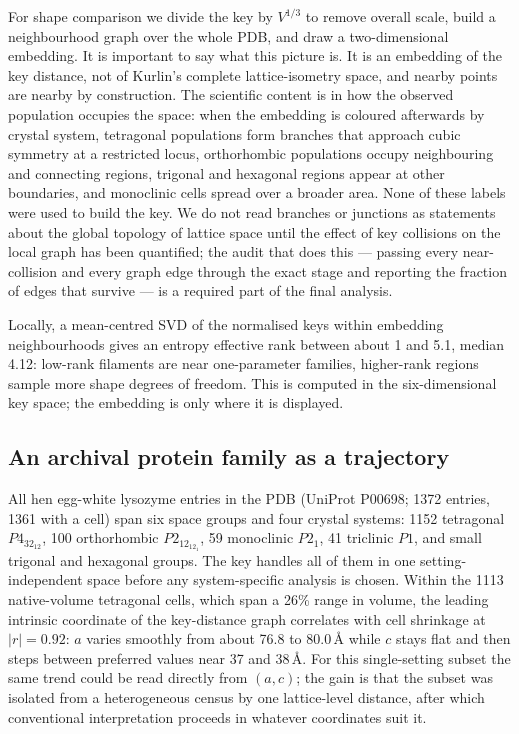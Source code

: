 \documentclass[11pt]{article}
\newcommand{\Ang}{\text{\AA}}
\begin{document}
For shape comparison we divide the key by $V^{1/3}$ to remove overall scale, build a neighbourhood graph over the whole PDB, and draw a two-dimensional embedding. It is important to say what this picture is. It is an embedding of the key distance, not of Kurlin's complete lattice-isometry space, and nearby points are nearby by construction. The scientific content is in how the observed population occupies the space: when the embedding is coloured afterwards by crystal system, tetragonal populations form branches that approach cubic symmetry at a restricted locus, orthorhombic populations occupy neighbouring and connecting regions, trigonal and hexagonal regions appear at other boundaries, and monoclinic cells spread over a broader area. None of these labels were used to build the key. We do not read branches or junctions as statements about the global topology of lattice space until the effect of key collisions on the local graph has been quantified; the audit that does this --- passing every near-collision and every graph edge through the exact stage and reporting the fraction of edges that survive --- is a required part of the final analysis.

Locally, a mean-centred SVD of the normalised keys within embedding neighbourhoods gives an entropy effective rank between about 1 and 5.1, median 4.12: low-rank filaments are near one-parameter families, higher-rank regions sample more shape degrees of freedom. This is computed in the six-dimensional key space; the embedding is only where it is displayed.


\subsection{An archival protein family as a trajectory}

All hen egg-white lysozyme entries in the PDB (UniProt P00698; 1372 entries, 1361 with a cell) span six space groups and four crystal systems: 1152 tetragonal $P4_32_12$, 100 orthorhombic $P2_12_12_1$, 59 monoclinic $P2_1$, 41 triclinic $P1$, and small trigonal and hexagonal groups. The key handles all of them in one setting-independent space before any system-specific analysis is chosen. Within the 1113 native-volume tetragonal cells, which span a 26\% range in volume, the leading intrinsic coordinate of the key-distance graph correlates with cell shrinkage at $|r|=0.92$: $a$ varies smoothly from about 76.8 to $80.0\,\Ang$ while $c$ stays flat and then steps between preferred values near 37 and $38\,\Ang$. For this single-setting subset the same trend could be read directly from $(a,c)$; the gain is that the subset was isolated from a heterogeneous census by one lattice-level distance, after which conventional interpretation proceeds in whatever coordinates suit it.
\end{document}
